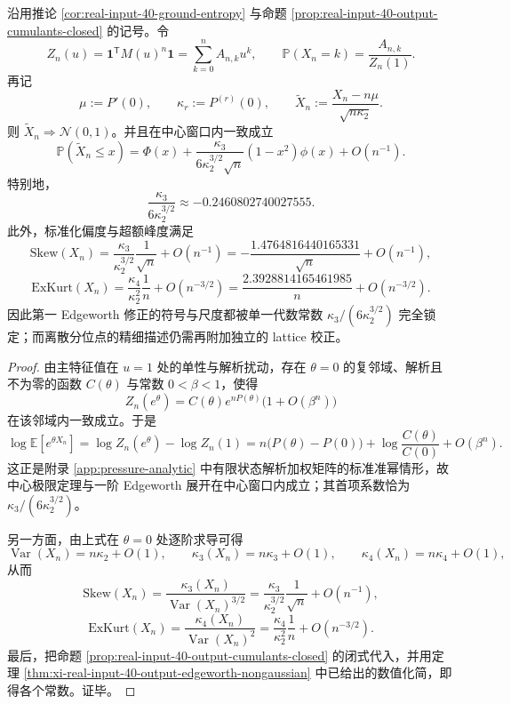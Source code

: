 \begin{theorem}\label{thm:xi-real-input-40-output-edgeworth-quasipowers}
沿用推论 \ref{cor:real-input-40-ground-entropy} 与命题 \ref{prop:real-input-40-output-cumulants-closed} 的记号。令
\[
Z_n(u)=\mathbf{1}^{\mathsf T}M(u)^n\mathbf{1}
=\sum_{k=0}^n A_{n,k}u^k,
\qquad
\mathbb P(X_n=k)=\frac{A_{n,k}}{Z_n(1)}.
\]
再记
\[
\mu:=P'(0),
\qquad
\kappa_r:=P^{(r)}(0),
\qquad
\widetilde X_n:=\frac{X_n-n\mu}{\sqrt{n\kappa_2}}.
\]
则 \(\widetilde X_n\Longrightarrow \mathcal N(0,1)\)。并且在中心窗口内一致成立
\[
\mathbb P(\widetilde X_n\le x)
=
\Phi(x)
+\frac{\kappa_3}{6\kappa_2^{3/2}\sqrt n}(1-x^2)\phi(x)
+O(n^{-1}).
\]
特别地，
\[
\frac{\kappa_3}{6\kappa_2^{3/2}}
\approx -0.2460802740027555.
\]
此外，标准化偏度与超额峰度满足
\[
\mathrm{Skew}(X_n)
=
\frac{\kappa_3}{\kappa_2^{3/2}}\frac{1}{\sqrt n}
+O(n^{-1})
=
-\frac{1.4764816440165331}{\sqrt n}+O(n^{-1}),
\]
\[
\mathrm{ExKurt}(X_n)
=
\frac{\kappa_4}{\kappa_2^2}\frac{1}{n}
+O(n^{-3/2})
=
\frac{2.3928814165461985}{n}+O(n^{-3/2}).
\]
因此第一 Edgeworth 修正的符号与尺度都被单一代数常数 \(\kappa_3/(6\kappa_2^{3/2})\) 完全锁定；而离散分位点的精细描述仍需再附加独立的 lattice 校正。
\end{theorem}
\begin{proof}
由主特征值在 \(u=1\) 处的单性与解析扰动，存在 \(\theta=0\) 的复邻域、解析且不为零的函数 \(C(\theta)\) 与常数 \(0<\beta<1\)，使得
\[
Z_n(e^\theta)
=
C(\theta)e^{nP(\theta)}\bigl(1+O(\beta^n)\bigr)
\]
在该邻域内一致成立。于是
\[
\log \mathbb E[e^{\theta X_n}]
=
\log Z_n(e^\theta)-\log Z_n(1)
=
n\bigl(P(\theta)-P(0)\bigr)
+\log\frac{C(\theta)}{C(0)}
+O(\beta^n).
\]
这正是附录 \ref{app:pressure-analytic} 中有限状态解析加权矩阵的标准准幂情形，故中心极限定理与一阶 Edgeworth 展开在中心窗口内成立；其首项系数恰为
\(
\kappa_3/(6\kappa_2^{3/2})
\)。

另一方面，由上式在 \(\theta=0\) 处逐阶求导可得
\[
\operatorname{Var}(X_n)=n\kappa_2+O(1),
\qquad
\kappa_3(X_n)=n\kappa_3+O(1),
\qquad
\kappa_4(X_n)=n\kappa_4+O(1),
\]
从而
\[
\mathrm{Skew}(X_n)
=
\frac{\kappa_3(X_n)}{\operatorname{Var}(X_n)^{3/2}}
=
\frac{\kappa_3}{\kappa_2^{3/2}}\frac{1}{\sqrt n}
+O(n^{-1}),
\]
\[
\mathrm{ExKurt}(X_n)
=
\frac{\kappa_4(X_n)}{\operatorname{Var}(X_n)^2}
=
\frac{\kappa_4}{\kappa_2^2}\frac{1}{n}
+O(n^{-3/2}).
\]
最后，把命题 \ref{prop:real-input-40-output-cumulants-closed} 的闭式代入，并用定理 \ref{thm:xi-real-input-40-output-edgeworth-nongaussian} 中已给出的数值化简，即得各个常数。证毕。
\end{proof}
